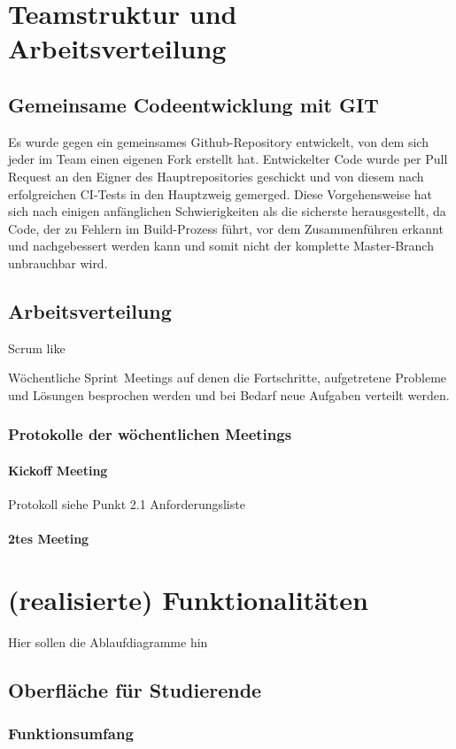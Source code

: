 \documentclass[12pt,a4paper,parskip]{scrreprt}
\begin{document}
\chapter{Teamstruktur und Arbeitsverteilung}
\section{Gemeinsame Codeentwicklung mit GIT}
Es wurde gegen ein gemeinsames Github-Repository entwickelt, von dem sich jeder im Team einen eigenen Fork erstellt hat. Entwickelter Code wurde per Pull Request an den Eigner des Hauptrepositories geschickt und von diesem nach erfolgreichen CI-Tests in den Hauptzweig gemerged. Diese Vorgehensweise hat sich nach einigen anfänglichen Schwierigkeiten als die sicherste herausgestellt, da Code, der zu Fehlern im Build-Prozess führt, vor dem Zusammenführen erkannt und nachgebessert werden kann und somit nicht der komplette Master-Branch unbrauchbar wird.
\section{Arbeitsverteilung}
Scrum like

Wöchentliche \glqq Sprint\grqq\ Meetings auf denen die Fortschritte, aufgetretene Probleme und Lösungen besprochen werden und bei Bedarf neue Aufgaben verteilt werden.
\subsection{Protokolle der wöchentlichen Meetings}
\subsubsection{Kickoff Meeting}
Protokoll siehe Punkt 2.1 Anforderungsliste
\subsubsection{2tes Meeting}

\chapter{(realisierte) Funktionalitäten}
Hier sollen die Ablaufdiagramme hin
\section{Oberfläche für Studierende}
\subsection{Funktionsumfang}
\end{document}
